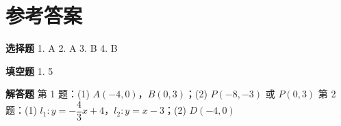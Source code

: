 \documentclass{exam-zh}
\begin{document}
\clearpage
\section*{参考答案}


\begin{keyideabox}
  \textbf{选择题}
  1. A  2. A  3. B  4. B
\end{keyideabox}



\begin{keyideabox}
  \textbf{填空题}
  1. 5
\end{keyideabox}



\begin{keyideabox}
  \textbf{解答题}
  第 1 题：(1) $A(-4, 0)$，$B(0, 3)$；(2) $P(-8, -3)$ 或 $P(0, 3)$
第 2 题：(1) $l_1: y = -\dfrac{4}{3}x + 4$，$l_2: y = x - 3$；(2) $D(-4, 0)$
\end{keyideabox}
\end{document}
